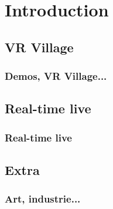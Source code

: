 \section{Introduction}
\subsection{VR Village}
\frame
{
  \frametitle{Demos, VR Village...}
%
}
\subsection{Real-time live}
\frame
{
  \frametitle{Real-time live}
%
}
\subsection{Extra}
\frame
{
  \frametitle{Art, industrie...}
%
}